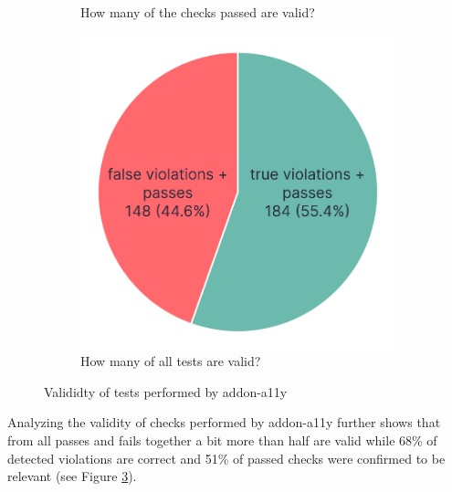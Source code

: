 \documentclass{master_thesis}
\begin{document}
\begin{figure}[ht]
\begin{subfigure}{0.4\textwidth}
	\caption{How many of the checks passed are valid?}
	\label{fig:checks-validity-passed}
	\end{subfigure}
	\hspace{0.05\textwidth}
	\begin{subfigure}{0.4\textwidth}
	\includegraphics[width=\textwidth]{img/all-test-results.png}
	\caption{How many of all tests are valid?}
	\label{fig:checks-validity-all}
	\end{subfigure}
\caption{Valididty of tests performed by addon-a11y}
\label{fig:checks-validity}
\end{figure}

Analyzing the validity of checks performed by addon-a11y further shows that from all passes and fails together a bit more than half are valid while 68\% of detected violations are correct and 51\% of passed checks were confirmed to be relevant (see Figure \ref{fig:checks-validity}).

\end{document}
